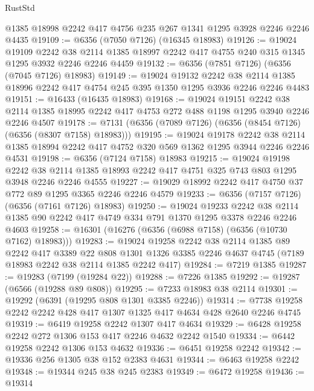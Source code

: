 \begin{lexlean}{RustStd}
\begin{coremodule}
    @1385
    @18998
    @2242
    @417
    @4756
    @235
    @267
    @1341
    @1295
    @3928
    @2246
    @2246
    @4435
@19109 := @6356 (@7050 @7126) (@16345 @18983)
@19126 := @19024
    @19109
    @2242
    @38
    @2114
    @1385
    @18997
    @2242
    @417
    @4755
    @240
    @315
    @1345
    @1295
    @3932
    @2246
    @2246
    @4459
@19132 := @6356 (@7851 @7126) (@6356 (@7045 @7126) @18983)
@19149 := @19024
    @19132
    @2242
    @38
    @2114
    @1385
    @18996
    @2242
    @417
    @4754
    @245
    @395
    @1350
    @1295
    @3936
    @2246
    @2246
    @4483
@19151 := @16433 (@16435 @18983)
@19168 := @19024
    @19151
    @2242
    @38
    @2114
    @1385
    @18995
    @2242
    @417
    @4753
    @272
    @488
    @1198
    @1295
    @3940
    @2246
    @2246
    @4507
@19178 := @7131 (@6356 (@7089 @7126) (@6356 (@8454 @7126) (@6356 (@8307 @7158) @18983)))
@19195 := @19024
    @19178
    @2242
    @38
    @2114
    @1385
    @18994
    @2242
    @417
    @4752
    @320
    @569
    @1362
    @1295
    @3944
    @2246
    @2246
    @4531
@19198 := @6356 (@7124 @7158) @18983
@19215 := @19024
    @19198
    @2242
    @38
    @2114
    @1385
    @18993
    @2242
    @417
    @4751
    @325
    @743
    @803
    @1295
    @3948
    @2246
    @2246
    @4555
@19227 := @19029 @18992 @2242 @417 @4750 @37 @772 @89 @1295 @3365 @2246 @2246 @4579
@19233 := @6356 (@7157 @7126) (@6356 (@7161 @7126) @18983)
@19250 := @19024
    @19233
    @2242
    @38
    @2114
    @1385
    @90
    @2242
    @417
    @4749
    @334
    @791
    @1370
    @1295
    @3378
    @2246
    @2246
    @4603
@19258 := @16301 (@16276 (@6356 (@6988 @7158) (@6356 (@10730 @7162) @18983)))
@19283 := @19024
    @19258
    @2242
    @38
    @2114
    @1385
    @89
    @2242
    @417
    @3389
    @22
    @808
    @1301
    @1326
    @3385
    @2246
    @4637
    @4745
    (@7189 @18983 @2242 @38 @2114 @1385 @2242 @417)
@19284 := @7219 @1385
@19287 := @19283 (@7199 (@19284 @22))
@19288 := @7226 @1385
@19292 := @19287 (@6566 (@19288 @89 @808))
@19295 := @7233 @18983 @38 @2114
@19301 := @19292 (@6391 (@19295 @808 @1301 @3385 @2246))
@19314 := @7738 @19258 @2242 @2242 @428 @417 @1307 @1325 @417 @4634 @428 @2640 @2246 @4745
@19319 := @6419 @19258 @2242 @1307 @417 @4634
@19329 := @6428 @19258 @2242 @272 @1306 @153 @417 @2246 @4632 @2242 @1540
@19334 := @6442 @19258 @2242 @1306 @153 @4632
@19336 := @6451 @19258 @2242
@19342 := @19336 @256 @1305 @38 @152 @2383 @4631
@19344 := @6463 @19258 @2242
@19348 := @19344 @245 @38 @245 @2383
@19349 := @6472 @19258
@19436 := @19314

\end{coremodule}
\end{lexlean}
